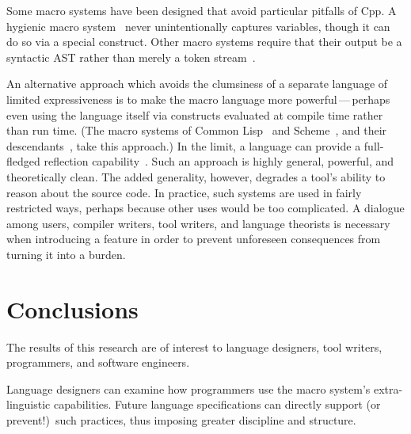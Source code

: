\documentclass[10pt]{article}
\begin{document}
Some macro systems have been designed that avoid particular pitfalls of Cpp.
A hygienic macro system~\cite{lfp86*151} never unintentionally captures
variables, though it can do so via a special construct.
Other macro systems require that their output be a syntactic AST rather
than merely a token stream~\cite{WeiseC93}.

An alternative approach which avoids the clumsiness of a separate language
of limited expressiveness is to make the macro language more
powerful\,---\,perhaps even using the language itself via constructs
evaluated at compile time rather than run time.  (The macro systems of
Common Lisp~\cite{commonlisp:languagespec} and
Scheme~\cite{KelseyCR98}, and their descendants~\cite{WeiseC93}, take
this approach.)  In the limit, a language can provide a full-fledged
reflection capability~\cite{kicz91}.  Such an approach is highly general,
powerful, and theoretically clean.  The added generality, however, degrades
a tool's ability to reason about the source code.  In practice, such
systems are used in fairly restricted ways, perhaps because other uses
would be too complicated.  A dialogue among users, compiler writers, tool
writers, and language theorists is necessary when introducing a feature in
order to prevent unforeseen consequences from turning it into a burden.



\section{Conclusions}
\label{sec:conclusion}




The results of this research are of interest to language designers, tool
writers, programmers, and software engineers.

Language designers can examine how programmers use the macro system's
extra-linguistic capabilities.  Future language specifications can
directly support (or prevent!)\ such practices, thus imposing greater
discipline and structure.
\end{document}
